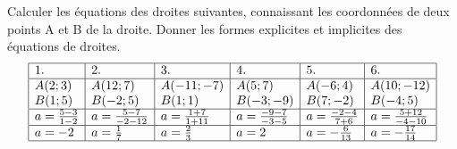 \begin{solution}
Calculer les équations des droites suivantes, connaissant les coordonnées de deux points A et B de la droite. Donner les formes explicites et implicites des équations de droites.
$$
\begin{array}{|l|l|l|l|l|l|}
\hline
1.                                                          & 2.                                                             & 3.                                                               & 4.                                                              & 5.                                                              & 6.                                                                \\ \hline
\begin{array}[c]{@{}l@{}}A(2 ;3)\\   B(1 ;5)\end{array} & \begin{array}[c]{@{}l@{}}A(12 ;7)\\   B(- 2 ;5)\end{array} & \begin{array}[c]{@{}l@{}}A(- 11 ;- 7)\\   B(1 ;1)\end{array} & \begin{array}[c]{@{}l@{}}A(5 ;7)\\   B(- 3 ;- 9)\end{array} & \begin{array}[c]{@{}l@{}}A(- 6 ;4)\\   B(7 ;- 2)\end{array} & \begin{array}[c]{@{}l@{}}A(10 ;- 12)\\   B(- 4 ;5)\end{array} \\ \hline
a=\frac{5-3}{1-2}                                        & a=\frac{5-7}{-2-12}                                         & a=\frac{1+7}{1+11}                                            & a=\frac{-9-7}{-3-5}                                          & a=\frac{-2-4}{7+6}                                           & a=\frac{5+12}{-4-10}                                           \\ \hline
a =-2                                                     & a=\frac{1}{7}                                               & a=\frac{2}{3}                                                 & a = 2                                                           & a=-\frac{6}{13}                                              & a=-\frac{17}{14}                                               \\ \hline

\end{array}$$
\end{solution}
